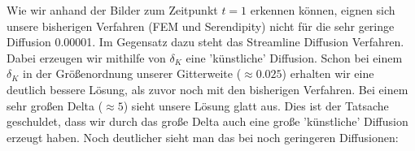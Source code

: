 \begin{figure}[H]
\end{figure}

Wie wir anhand der Bilder zum Zeitpunkt $t=1$ erkennen können, eignen sich unsere bisherigen Verfahren (FEM und Serendipity) nicht für die sehr geringe Diffusion 0.00001. Im Gegensatz dazu steht das Streamline Diffusion Verfahren. Dabei erzeugen wir mithilfe von $\delta_K$ eine 'künstliche' Diffusion. Schon bei einem $\delta_K$ in der Größenordnung unserer Gitterweite ($\approx 0.025$)
erhalten wir eine deutlich bessere Lösung, als zuvor noch mit den bisherigen Verfahren. Bei einem sehr großen Delta 
($\approx 5$) sieht unsere Lösung glatt aus. Dies ist der Tatsache geschuldet, dass wir durch das große Delta auch eine große 'künstliche' Diffusion erzeugt haben. Noch deutlicher sieht man das bei noch geringeren Diffusionen:

